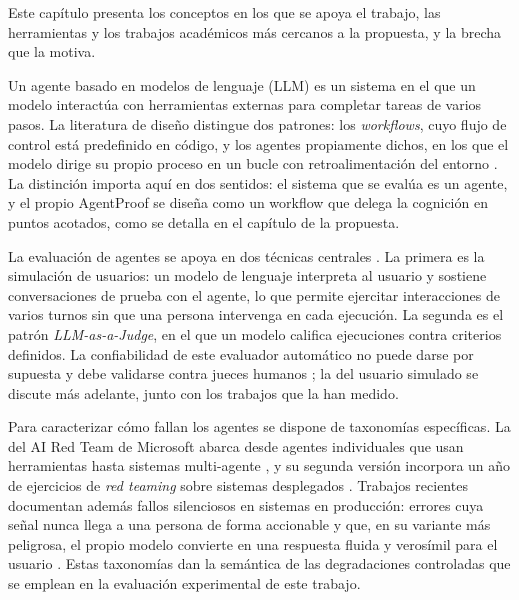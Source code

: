 \clearpage
\blank
{}
\begingroup\dobleesp
\vspace{6pt}
Este capítulo presenta los conceptos en los que se apoya el trabajo, las herramientas y los trabajos académicos más cercanos a la propuesta, y la brecha que la motiva.
\par

Un agente basado en modelos de lenguaje (LLM) es un sistema en el que un modelo interactúa con herramientas externas para completar tareas de varios pasos. La literatura de diseño distingue dos patrones: los \textit{workflows}, cuyo flujo de control está predefinido en código, y los agentes propiamente dichos, en los que el modelo dirige su propio proceso en un bucle con retroalimentación del entorno \cite{anthropic2024agents}. La distinción importa aquí en dos sentidos: el sistema que se evalúa es un agente, y el propio AgentProof se diseña como un workflow que delega la cognición en puntos acotados, como se detalla en el capítulo de la propuesta.
\par\vspace{6pt}
La evaluación de agentes se apoya en dos técnicas centrales \cite{yehudai2025survey}. La primera es la simulación de usuarios: un modelo de lenguaje interpreta al usuario y sostiene conversaciones de prueba con el agente, lo que permite ejercitar interacciones de varios turnos sin que una persona intervenga en cada ejecución. La segunda es el patrón \textit{LLM-as-a-Judge}, en el que un modelo califica ejecuciones contra criterios definidos. La confiabilidad de este evaluador automático no puede darse por supuesta y debe validarse contra jueces humanos \cite{yehudai2025survey}; la del usuario simulado se discute más adelante, junto con los trabajos que la han medido.
\par\vspace{6pt}
Para caracterizar cómo fallan los agentes se dispone de taxonomías específicas. La del AI Red Team de Microsoft abarca desde agentes individuales que usan herramientas hasta sistemas multi-agente \cite{msredteam2025taxonomy}, y su segunda versión incorpora un año de ejercicios de \textit{red teaming} sobre sistemas desplegados \cite{msredteam2026taxonomy}. Trabajos recientes documentan además fallos silenciosos en sistemas en producción: errores cuya señal nunca llega a una persona de forma accionable y que, en su variante más peligrosa, el propio modelo convierte en una respuesta fluida y verosímil para el usuario \cite{wu2026narratives}. Estas taxonomías dan la semántica de las degradaciones controladas que se emplean en la evaluación experimental de este trabajo.
\par

